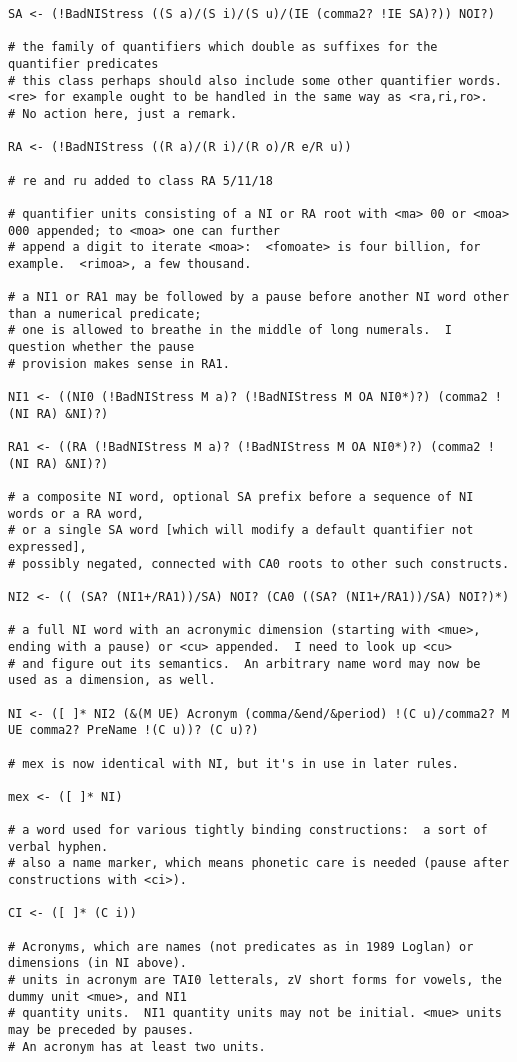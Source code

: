 \documentclass[12pt]{book}
\begin{document}
{\begin{verbatim}
SA <- (!BadNIStress ((S a)/(S i)/(S u)/(IE (comma2? !IE SA)?)) NOI?)

# the family of quantifiers which double as suffixes for the quantifier predicates
# this class perhaps should also include some other quantifier words. <re> for example ought to be handled in the same way as <ra,ri,ro>.
# No action here, just a remark.

RA <- (!BadNIStress ((R a)/(R i)/(R o)/R e/R u))

# re and ru added to class RA 5/11/18

# quantifier units consisting of a NI or RA root with <ma> 00 or <moa> 000 appended; to <moa> one can further
# append a digit to iterate <moa>:  <fomoate> is four billion, for example.  <rimoa>, a few thousand.

# a NI1 or RA1 may be followed by a pause before another NI word other than a numerical predicate;
# one is allowed to breathe in the middle of long numerals.  I question whether the pause
# provision makes sense in RA1.

NI1 <- ((NI0 (!BadNIStress M a)? (!BadNIStress M OA NI0*)?) (comma2 !(NI RA) &NI)?)

RA1 <- ((RA (!BadNIStress M a)? (!BadNIStress M OA NI0*)?) (comma2 !(NI RA) &NI)?)

# a composite NI word, optional SA prefix before a sequence of NI words or a RA word,
# or a single SA word [which will modify a default quantifier not expressed], 
# possibly negated, connected with CA0 roots to other such constructs.

NI2 <- (( (SA? (NI1+/RA1))/SA) NOI? (CA0 ((SA? (NI1+/RA1))/SA) NOI?)*)

# a full NI word with an acronymic dimension (starting with <mue>, ending with a pause) or <cu> appended.  I need to look up <cu>
# and figure out its semantics.  An arbitrary name word may now be used as a dimension, as well.

NI <- ([ ]* NI2 (&(M UE) Acronym (comma/&end/&period) !(C u)/comma2? M UE comma2? PreName !(C u))? (C u)?)

# mex is now identical with NI, but it's in use in later rules.

mex <- ([ ]* NI)

# a word used for various tightly binding constructions:  a sort of verbal hyphen.
# also a name marker, which means phonetic care is needed (pause after constructions with <ci>).

CI <- ([ ]* (C i))

# Acronyms, which are names (not predicates as in 1989 Loglan) or dimensions (in NI above).
# units in acronym are TAI0 letterals, zV short forms for vowels, the dummy unit <mue>, and NI1
# quantity units.  NI1 quantity units may not be initial. <mue> units may be preceded by pauses.
# An acronym has at least two units.


\end{verbatim}}
\end{document}
